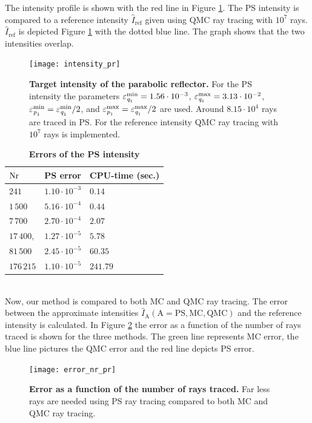The intensity profile is shown with the red line in Figure \ref{fig:intensity_pr}. The PS intensity is compared to a reference intensity $\hat{I}_{\textrm{ref}}$ given using QMC ray tracing with $10^7$ rays. $\hat{I}_{\textrm{ref}}$ is depicted Figure \ref{fig:intensity_pr} with the dotted blue line. The graph shows that the two intensities overlap.
 \begin{figure}[h!]
  \center
  \texttt{[image: intensity\_pr]}
  \caption{\textbf{Target intensity of the parabolic reflector.} For the PS intensity the parameters $\varepsilon_{\textit{q}_1}^{\textrm{min}}=1.56\cdot 10^{-3}$, $\varepsilon_{\textit{q}_1}^{\textrm{max}}=3.13\cdot 10^{-2}$, $\varepsilon_{\textit{p}_1}^{\textrm{min}}=\varepsilon_{\textit{q}_1}^{\textrm{min}}/2$, and $\varepsilon_{\textit{p}_1}^{\textrm{max}}=\varepsilon_{\textit{q}_1}^{\textrm{max}}/2$ are used. Around $8.15 \cdot 10^{4}$ rays are traced in PS. For the reference intensity QMC ray tracing with $10^7$ rays is implemented.}
  \label{fig:intensity_pr}
\end{figure}
\begin{table}[ht] \label{tab:table_tir_triangulation}
\centering
\caption{\bf Errors of the PS intensity}
\begin{tabular}{lll}
 \hline   $\textrm{Nr}$ & PS error & CPU-time (sec.) \\
  \hline 
 $241$        & $1.10\cdot10^{-3}$ & $0.14$\\
 $1\,500$     & $5.16\cdot 10^{-4}$ & $0.44$ \\
 $7\,700$     & $2.70\cdot 10^{-4}$ & $2.07$\\
 $17\,400,$   & $1.27\cdot 10^{-5}$ & $5.78$\\
 $81\,500$    & $2.45\cdot 10^{-5}$ & $60.35$\\
 $176\,215$   & $1.10\cdot 10^{-5}$ & $241.79$\\
 \hline
 \end{tabular}
 \label{tab:ps_error_triangulation}
 \end{table}
\\ \indent 
Now, our method is compared to both MC and QMC ray tracing. 
The error between the approximate intensities $\hat{I}_{\textrm{A}}(\textrm{A}=\textrm{PS}, \textrm{MC}, \textrm{QMC})$ and the reference intensity is calculated. In Figure \ref{fig:error_rays_pr} the error as a function of the number of rays traced is shown for the three methods.
The green line represents MC error, the blue line pictures the QMC error and the red line depicts PS error.
\begin{figure}[h!]
  \center
  \texttt{[image: error\_nr\_pr]}
  \caption{\textbf{Error as a function of the number of rays traced.} Far less rays are needed using PS ray tracing compared to both MC and QMC ray tracing.}
  \label{fig:error_rays_pr}
\end{figure} 
